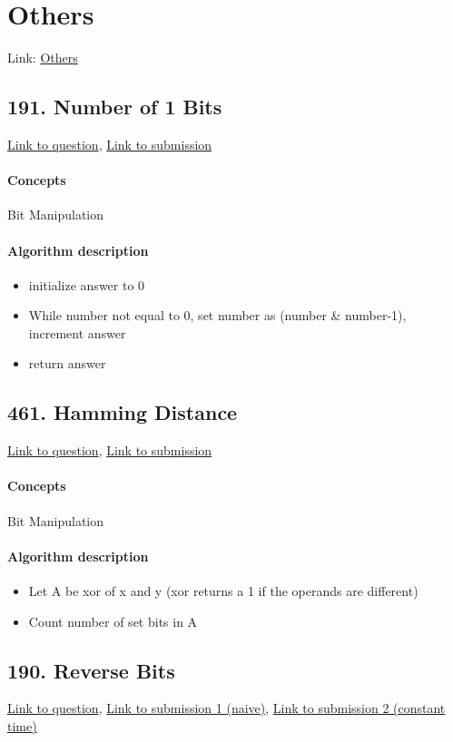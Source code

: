 \documentclass[11pt]{book}
\begin{document}
\section{Others}
Link: \href{https://leetcode.com/explore/featured/card/top-interview-questions-easy/99/others/}{Others}

\subsection{191. Number of 1 Bits}
\href{https://leetcode.com/problems/number-of-1-bits/}{Link to question},
\href{https://leetcode.com/submissions/detail/335731817/}{Link to submission}
\paragraph{Concepts}
Bit Manipulation
\paragraph{Algorithm description}
\begin{itemize}
    \item initialize answer to 0
    \item While number not equal to 0, set number as (number \& number-1), increment answer
    \item return answer
\end{itemize}

\subsection{461. Hamming Distance}
\href{https://leetcode.com/problems/hamming-distance/}{Link to question},
\href{https://leetcode.com/submissions/detail/335742515/}{Link to submission}
\paragraph{Concepts}
Bit Manipulation
\paragraph{Algorithm description}
\begin{itemize}
    \item Let A be xor of x and y (xor returns a 1 if the operands are different)
    \item Count number of set bits in A
\end{itemize}

\subsection{190. Reverse Bits}
\href{https://leetcode.com/problems/reverse-bits/}{Link to question},
\href{https://leetcode.com/submissions/detail/335782937/}{Link to submission 1 (naive)},
\href{https://leetcode.com/submissions/detail/323297368/}{Link to submission 2 (constant time)}
\end{document}
